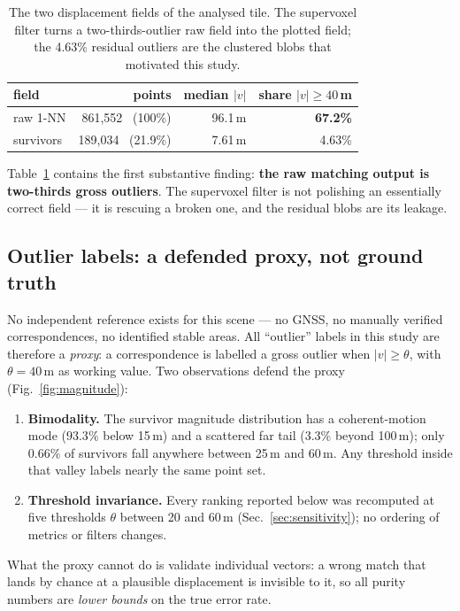 \documentclass[11pt,a4paper]{article}
\newcommand{\vv}{\lvert v\rvert}
\begin{document}
\begin{table}[t]
\centering
\caption{The two displacement fields of the analysed tile. The supervoxel
filter turns a two-thirds-outlier raw field into the plotted field; the
4.63\% residual outliers are the clustered blobs that motivated this study.}
\label{tab:fields}
\begin{tabular}{lrrr}
\toprule
field & points & median $\vv$ & share $\vv\ge40$\,m\\
\midrule
raw 1-NN        & 861{,}552 \ (100\%) & 96.1\,m & \textbf{67.2\%}\\
survivors       & 189{,}034 \ (21.9\%) & 7.61\,m & 4.63\%\\
\bottomrule
\end{tabular}
\end{table}

Table~\ref{tab:fields} contains the first substantive finding: \textbf{the
raw matching output is two-thirds gross outliers}. The supervoxel filter is
not polishing an essentially correct field --- it is rescuing a broken one,
and the residual blobs are its leakage.

\subsection{Outlier labels: a defended proxy, not ground truth}
\label{sec:labels}

No independent reference exists for this scene --- no GNSS, no manually
verified correspondences, no identified stable areas. All ``outlier'' labels
in this study are therefore a \emph{proxy}: a correspondence is labelled a
gross outlier when $\vv\ge\theta$, with $\theta=40$\,m as working value. Two
observations defend the proxy (Fig.~\ref{fig:magnitude}):

\begin{enumerate}
  \item \textbf{Bimodality.} The survivor magnitude distribution has a
  coherent-motion mode ($93.3\%$ below 15\,m) and a scattered far tail
  ($3.3\%$ beyond 100\,m); only $0.66\%$ of survivors fall anywhere between
  25\,m and 60\,m. Any threshold inside that valley labels nearly the same
  point set.
  \item \textbf{Threshold invariance.} Every ranking reported below was
  recomputed at five thresholds $\theta$ between 20 and 60\,m
  (Sec.~\ref{sec:sensitivity}); no ordering of metrics or filters changes.
\end{enumerate}

What the proxy cannot do is validate individual vectors: a wrong match that
lands by chance at a plausible displacement is invisible to it, so all
purity numbers are \emph{lower bounds} on the true error rate.
\end{document}
